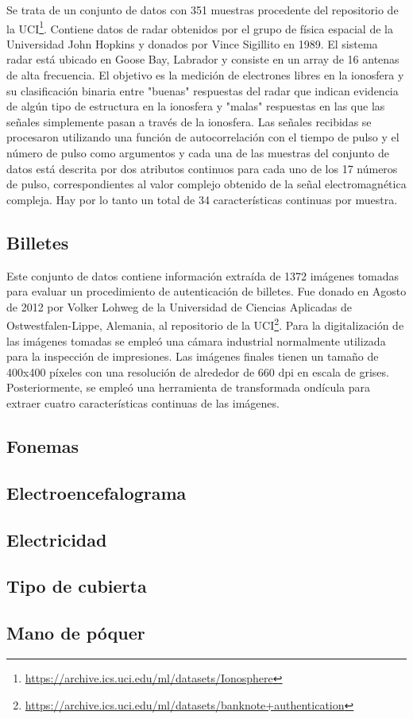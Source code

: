 Se trata de un conjunto de datos con 351 muestras procedente del repositorio de la UCI\footnote{\url{https://archive.ics.uci.edu/ml/datasets/Ionosphere}}. Contiene datos de radar obtenidos por el grupo de física espacial de la Universidad John Hopkins y donados por Vince Sigillito en 1989. El sistema radar está ubicado en Goose Bay, Labrador y consiste en un array de 16 antenas de alta frecuencia. El objetivo es la medición de electrones libres en la ionosfera y su clasificación binaria entre "buenas" respuestas del radar que indican evidencia de algún tipo de estructura en la ionosfera y "malas" respuestas en las que las señales simplemente pasan a través de la ionosfera. Las señales recibidas se procesaron utilizando una función de autocorrelación con el tiempo de pulso y el número de pulso como argumentos y cada una de las muestras del conjunto de datos está descrita por dos atributos continuos para cada uno de los 17 números de pulso, correspondientes al valor complejo obtenido de la señal electromagnética compleja. Hay por lo tanto un total de 34 características continuas por muestra.

\subsection{Billetes}

Este conjunto de datos contiene información extraída de 1372 imágenes tomadas para evaluar un procedimiento de autenticación de billetes. Fue donado en Agosto de 2012 por Volker Lohweg de la Universidad de Ciencias Aplicadas de Ostwestfalen-Lippe, Alemania, al repositorio de la UCI\footnote{\url{https://archive.ics.uci.edu/ml/datasets/banknote+authentication}}. Para la digitalización de las imágenes tomadas se empleó una cámara industrial normalmente utilizada para la inspección de impresiones. Las imágenes finales tienen un tamaño de 400x400 píxeles con una resolución de alrededor de 660 dpi en escala de grises. Posteriormente, se empleó una herramienta de transformada ondícula para extraer cuatro características continuas de las imágenes.

\subsection{Fonemas}
\subsection{Electroencefalograma}
\subsection{Electricidad}
\subsection{Tipo de cubierta}
\subsection{Mano de póquer}
